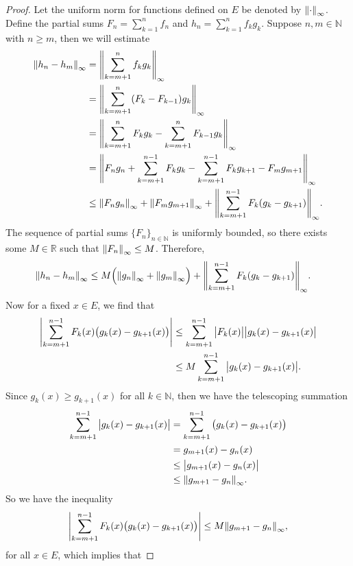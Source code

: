 \documentclass[12pt]{article}
\theoremstyle{definition}
\newcommand{\N}{\mathbb{N}}
\newcommand{\R}{\mathbb{R}}
\newcommand{\supnorm}[1]{\norm{#1}_{\infty}}
\begin{document}
\begin{proof}
    Let the uniform norm for functions defined on $E$ be denoted by $\norm{\cdot}_\infty$. Define the partial sums $F_n = \sum_{k=1}^{n} f_n$ and $h_n = \sum_{k=1}^{n} f_k g_k$. Suppose $n, m \in \N$ with $n \geq m$, then we will estimate
    \begin{align*}
        \supnorm{h_n - h_m}
            &= \supnorm{\sum_{k=m+1}^{n} f_k g_k} \\
            &= \supnorm{\sum_{k=m+1}^{n} (F_k - F_{k-1}) g_k} \\
            &= \supnorm{\sum_{k=m+1}^{n} F_k g_k - \sum_{k=m+1}^{n} F_{k-1} g_k} \\
            &= \supnorm{F_n g_n + \sum_{k=m+1}^{n-1} F_k g_k - \sum_{k=m+1}^{n-1} F_k g_{k+1} - F_m g_{m+1}} \\
            &\leq \supnorm{F_n g_n} + \supnorm{F_m g_{m+1}} + \supnorm{\sum_{k=m+1}^{n-1} F_k(g_k - g_{k+1})}.
    \end{align*}
    The sequence of partial sums $\{F_n\}_{n\in\N}$ is uniformly bounded, so there exists some $M \in \R$ such that $\supnorm{F_n} \leq M$. Therefore,
    \begin{align*}
        \supnorm{h_n - h_m}
            &\leq M \qty\Big(\supnorm{g_n} + \supnorm{g_{m}}) + \supnorm{\sum_{k=m+1}^{n-1} F_k(g_k - g_{k+1})}.
    \end{align*}
    Now for a fixed $x \in E$, we find that
    \begin{align*}
        \abs{\sum_{k=m+1}^{n-1} F_k(x)\qty\big(g_k(x) - g_{k+1}(x))}
            &\leq \sum_{k=m+1}^{n-1} \abs\big{F_k(x)} \abs\big{g_k(x) - g_{k+1}(x)} \\
            &\leq M \sum_{k=m+1}^{n-1} \abs\big{g_k(x) - g_{k+1}(x)}.
    \end{align*}
    Since $g_k(x) \geq g_{k+1}(x)$ for all $k \in \N$, then we have the telescoping summation
    \begin{align*}
        \sum_{k=m+1}^{n-1} \abs\big{g_k(x) - g_{k+1}(x)}
            &= \sum_{k=m+1}^{n-1} \qty\big(g_k(x) - g_{k+1}(x)) \\
            &= g_{m+1}(x) - g_n(x) \\
            &\leq \abs\big{g_{m+1}(x) - g_n(x)} \\
            &\leq \supnorm{g_{m+1} - g_n}.
    \end{align*}
    So we have the inequality
    \[
        \abs{\sum_{k=m+1}^{n-1} F_k(x)\qty\big(g_k(x) - g_{k+1}(x))} \leq M\supnorm{g_{m+1} - g_n},
    \]
    for all $x \in E$, which implies that

\end{proof}
\end{document}
